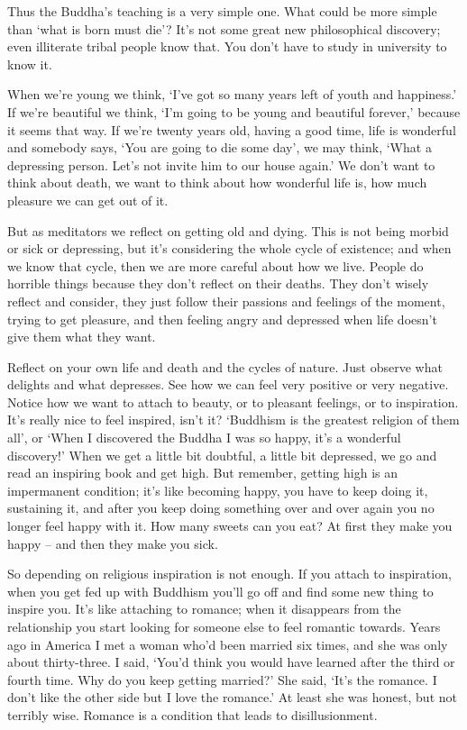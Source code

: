 Thus the Buddha's teaching is a very simple one. What could be more simple than `what is born must die'? It's not some great new philosophical discovery; even illiterate tribal people know that. You don't have to study in university to know it.

When we're young we think, `I've got so many years left of youth and happiness.' If we're beautiful we think, `I'm going to be young and beautiful forever,' because it seems that way. If we're twenty years old, having a good time, life is wonderful and somebody says, `You are going to die some day', we may think, `What a depressing person. Let's not invite him to our house again.' We don't want to think about death, we want to think about how wonderful life is, how much pleasure we can get out of it.

But as meditators we reflect on getting old and dying. This is not being morbid or sick or depressing, but it's considering the whole cycle of existence; and when we know that cycle, then we are more careful about how we live. People do horrible things because they don't reflect on their deaths. They don't wisely reflect and consider, they just follow their passions and feelings of the moment, trying to get pleasure, and then feeling angry and depressed when life doesn't give them what they want.

Reflect on your own life and death and the cycles of nature. Just observe what delights and what depresses. See how we can feel very positive or very negative. Notice how we want to attach to beauty, or to pleasant feelings, or to inspiration. It's really nice to feel inspired, isn't it? `Buddhism is the greatest religion of them all', or `When I discovered the Buddha I was so happy, it's a wonderful discovery!' When we get a little bit doubtful, a little bit depressed, we go and read an inspiring book and get high. But remember, getting high is an impermanent condition; it's like becoming happy, you have to keep doing it, sustaining it, and after you keep doing something over and over again you no longer feel happy with it. How many sweets can you eat? At first they make you happy -- and then they make you sick.

So depending on religious inspiration is not enough. If you attach to inspiration, when you get fed up with Buddhism you'll go off and find some new thing to inspire you. It's like attaching to romance; when it disappears from the relationship you start looking for someone else to feel romantic towards. Years ago in America I met a woman who'd been married six times, and she was only about thirty-three. I said, `You'd think you would have learned after the third or fourth time. Why do you keep getting married?' She said, `It's the romance. I don't like the other side but I love the romance.' At least she was honest, but not terribly wise. Romance is a condition that leads to disillusionment.

